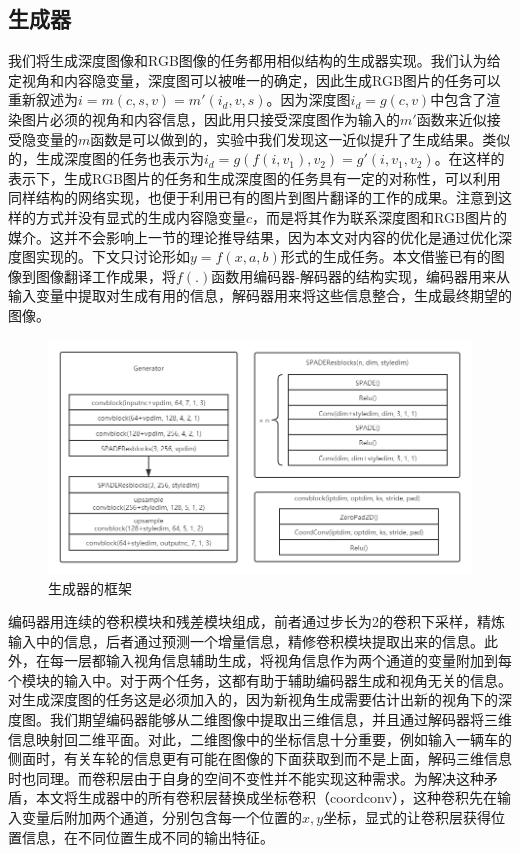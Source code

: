 \documentclass[UTF8,openany,AutoFakeBold,AutoFakeSlant,cs4size]{ctexbook}
\begin{document}
\subsection{生成器}

我们将生成深度图像和RGB图像的任务都用相似结构的生成器实现。我们认为给定视角和内容隐变量，深度图可以被唯一的确定，因此生成RGB图片的任务可以重新叙述为$i = m(c, s, v) = m'(i_d, v, s)$。因为深度图$i_d = g(c, v)$中包含了渲染图片必须的视角和内容信息，因此用只接受深度图作为输入的$m'$函数来近似接受隐变量的$m$函数是可以做到的，实验中我们发现这一近似提升了生成结果。类似的，生成深度图的任务也表示为$i_{d} = g(f(i, v_1), v_2) = g'(i, v_1, v_2)$。在这样的表示下，生成RGB图片的任务和生成深度图的任务具有一定的对称性，可以利用同样结构的网络实现，也便于利用已有的图片到图片翻译的工作的成果。注意到这样的方式并没有显式的生成内容隐变量$c$，而是将其作为联系深度图和RGB图片的媒介。这并不会影响上一节的理论推导结果，因为本文对内容的优化是通过优化深度图实现的。下文只讨论形如$y = f(x, a, b)$形式的生成任务。本文借鉴已有的图像到图像翻译工作成果，将$f(.)$函数用编码器-解码器的结构实现，编码器用来从输入变量中提取对生成有用的信息，解码器用来将这些信息整合，生成最终期望的图像。

\begin{figure}
\centering
\includegraphics[width=15cm]{./images/generator.png}
\caption{生成器的框架}
\label{model_generator}
\end{figure}


编码器用连续的卷积模块和残差模块组成，前者通过步长为2的卷积下采样，精炼输入中的信息，后者通过预测一个增量信息，精修卷积模块提取出来的信息。此外，在每一层都输入视角信息辅助生成，将视角信息作为两个通道的变量附加到每个模块的输入中。对于两个任务，这都有助于辅助编码器生成和视角无关的信息。对生成深度图的任务这是必须加入的，因为新视角生成需要估计出新的视角下的深度图。我们期望编码器能够从二维图像中提取出三维信息，并且通过解码器将三维信息映射回二维平面。对此，二维图像中的坐标信息十分重要，例如输入一辆车的侧面时，有关车轮的信息更有可能在图像的下面获取到而不是上面，解码三维信息时也同理。而卷积层由于自身的空间不变性并不能实现这种需求。为解决这种矛盾，本文将生成器中的所有卷积层替换成坐标卷积（coordconv），这种卷积先在输入变量后附加两个通道，分别包含每一个位置的$x,y$坐标，显式的让卷积层获得位置信息，在不同位置生成不同的输出特征。
\end{document}
